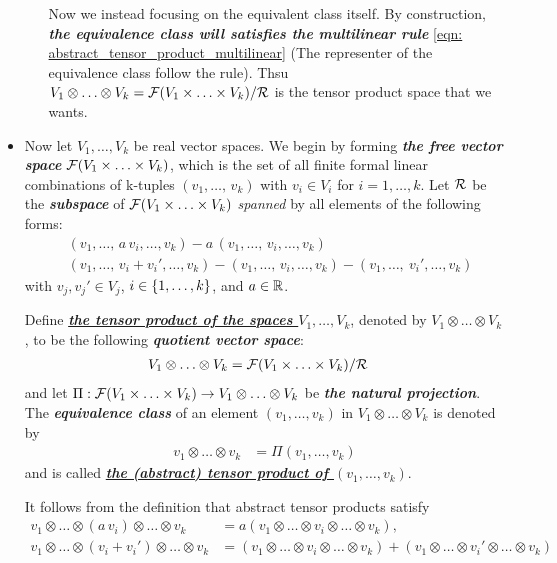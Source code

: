 \documentclass[11pt]{article}
\begin{document}
\begin{itemize}
\begin{remark}
\begin{enumerate}
Now we instead focusing on the equivalent class itself. By construction, \emph{\textbf{the equivalence class will satisfies the multilinear rule}} \eqref{eqn: abstract_tensor_product_multilinear} (The representer of the equivalence class follow the rule). Thsu $V_1 \otimes \ldots \otimes V_k = {\mathcal F}(V_1\times \ldots \times V_k) / {\mathcal R}$ is the tensor product space that we wants. 
\end{enumerate}
\end{remark}

\item \begin{definition}
Now let $V_1,\ldots,V_k$ be real vector spaces. We begin by forming \emph{\textbf{the free vector space}} ${\mathcal F}(V_1\times \ldots \times V_k)$, which is the set of all finite formal linear combinations of k-tuples $(v_1,\ldots,\,v_k)$ with $v_i \in V_i$ for $i = 1,\ldots,k$. Let ${\mathcal R}$ be the \emph{\textbf{subspace}} of ${\mathcal F}(V_1\times \ldots \times V_k)$ \emph{spanned} by all elements of the following forms:
\begin{align}
&(v_1,\ldots,\,a\,v_i, \ldots, v_k) - a\,(v_1,\ldots,\,v_i, \ldots, v_k) \nonumber\\
&(v_1,\ldots,\,v_i + v_i', \ldots, v_k) - (v_1,\ldots,\,v_i, \ldots, v_k) -  (v_1,\ldots,\ v_i', \ldots, v_k)  \label{eqn: abstract_tensor_product_subspace_equiv}
\end{align} with $v_j, v_j' \in V_j$, $i \in \left\{1,\ldots,k\right\}$, and $a \in {\mathbb R}$.

Define \underline{\emph{\textbf{the tensor product of the spaces $V_1,\ldots,V_k$}}}, denoted by $V_1 \otimes \ldots \otimes V_k$,
to be the following \emph{\textbf{quotient vector space}}:
\begin{align*}
V_1 \otimes \ldots \otimes V_k &= {\mathcal F}(V_1\times \ldots \times V_k) / {\mathcal R}
\end{align*}
and let $\Pi:  {\mathcal F}(V_1\times \ldots \times V_k)  \rightarrow V_1 \otimes \ldots \otimes V_k$ be \emph{\textbf{the natural projection}}. The \emph{\textbf{equivalence class}} of an element $(v_1, \ldots, v_k)$ in $V_1 \otimes \ldots \otimes V_k$ is denoted by
\begin{align}
v_1 \otimes \ldots \otimes v_k &= \Pi(v_1, \ldots, v_k)\label{eqn: abstract_tensor_product_space_element}
\end{align}
and is called \underline{\emph{\textbf{the (abstract) tensor product of $(v_1, \ldots, v_k)$}}}. 

It follows from the definition that abstract tensor products satisfy
\begin{align*}
v_1 \otimes \ldots \otimes (a\,v_i)  \otimes \ldots \otimes v_k  &= a (v_1  \otimes \ldots  \otimes v_i \otimes \ldots \otimes v_k),\\
v_1 \otimes \ldots \otimes (v_i + v_i') \otimes \ldots \otimes v_k &= (v_1 \otimes \ldots \otimes v_i \otimes \ldots \otimes v_k) +  (v_1 \otimes \ldots \otimes v_i' \otimes \ldots \otimes v_k) 
\end{align*}
\end{definition}


\end{itemize}
\end{document}
